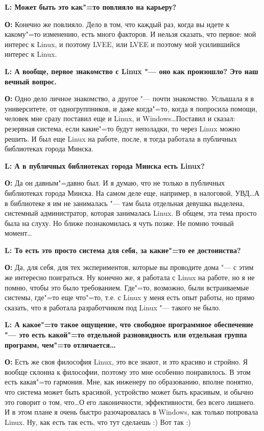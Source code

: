 \documentclass[10pt, a5paper]{article}
\begin{document}
{\noindent \bf L: Может быть это как"=то повлияло на карьеру?}

{\noindent \bf О:} Конечно же повлияло. Дело в том, что каждый раз, когда вы идете к какому"=то изменению, есть много факторов. И нельзя сказать, что первое: мой интерес к Linux, и поэтому LVEE,  или LVEE и поэтому мой усилившийся интерес к Linux.

{\noindent \bf L: А вообще, первое знакомство с Linux "--- оно как произошло? Это наш вечный вопрос.}

{\noindent \bf О:} Одно дело личное знакомство, а другое "--- почти знакомство. Услышала я в университете, от одногруппников, и даже когда"=то, когда я попросила помощи, человек мне сразу поставил еще и Linux, и Windows\ldots Поставил и сказал: резервная система, если какие"=то будут неполадки, то через Linux можно решить. И был еще Linux на работе, после, я тогда работала в публичных библиотеках города Минска.

{\noindent \bf L: А в публичных библиотеках города Минска есть Linux?}

{\noindent \bf О:} Да он давным"=давно был. И я думаю, что не только в публичных библиотеках города Минска. На самом деле еще, например, в налоговой, УВД\ldots А в библиотеке я им не занималась "--- там была отдельная девушка выделена, системный администратор, которая занималась Linux. В общем, эта тема просто была на слуху. Но ближе познакомилась я чуть позже. Не помню точный момент\ldots

{\noindent \bf L: То есть это просто система для себя, за какие"=то ее достоинства?}


{\noindent \bf О:} Да, для себя, для тех экспериментов, которые вы проводите дома "--- с этим же интересно поиграться. Ну конечно же, я работала с Linux на работе, но я не помню, чтобы это было требованием. Где"=то, возможно, были встраиваемые системы, где"=то еще что"=то, т.е. с Linux у меня есть опыт работы, но прямо сказать, что я работала разработчиком под Linux "--- такого не было. 

{\noindent \bf L: А какое"=то такое ощущение, что свободное программное обеспечение "--- это есть какой"=то отдельной разновидность или отдельная группа программ, чем"=то отличается\ldots}

{\noindent \bf О:} Есть же своя философия Linux, это все знают, и это красиво и стройно. Я вообще склонна к философии, поэтому это мне особенно понравилось. В этом есть какая"=то гармония. Мне, как инженеру по образованию, вполне понятно, что система может быть красивой, устройство может быть красивым, и обычно это говорит о том, что\ldots О его лаконичности, эффективности, без всего лишнего. И в этом плане я очень быстро разочаровалась в Windows, как только попровала Linux. Ну, как есть так есть, что тут сделаешь :) Вот так :)
\end{document}
